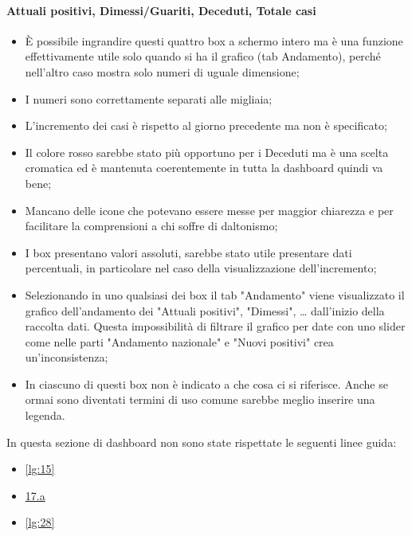 \paragraph{Attuali positivi, Dimessi/Guariti, Deceduti, Totale casi}
\begin{itemize}
    \item \`E possibile ingrandire questi quattro box a schermo intero ma è una funzione effettivamente utile solo quando si ha il grafico (tab Andamento), perché nell'altro caso mostra solo numeri di uguale dimensione;
    \item I numeri sono correttamente separati alle migliaia;
    \item L'incremento dei casi è rispetto al giorno precedente ma non è specificato;
    \item Il colore rosso sarebbe stato più opportuno per i Deceduti ma è una scelta cromatica ed è mantenuta coerentemente in tutta la dashboard quindi va bene;
    \item Mancano delle icone che potevano essere messe per maggior chiarezza e per facilitare la comprensioni a chi soffre di daltonismo;
    \item I box presentano valori assoluti, sarebbe stato utile presentare dati percentuali, in particolare nel caso della visualizzazione dell'incremento;
    \item Selezionando in uno qualsiasi dei box il tab "Andamento" viene visualizzato il grafico dell'andamento dei "Attuali positivi", "Dimessi", … dall'inizio della raccolta dati. Questa impossibilità di filtrare il grafico per date con uno slider come nelle parti "Andamento nazionale" e "Nuovi positivi" crea un'inconsistenza;
    \item In ciascuno di questi box non è indicato a che cosa ci si riferisce. Anche se ormai sono diventati termini di uso comune sarebbe meglio inserire una legenda.
\end{itemize}
In questa sezione di dashboard non sono state rispettate le seguenti linee guida:
\begin{itemize}
    \item \ref{lg:15}
    \item \hyperref[lg:17.a]{17.a}
    \item \ref{lg:28}
\end{itemize}


